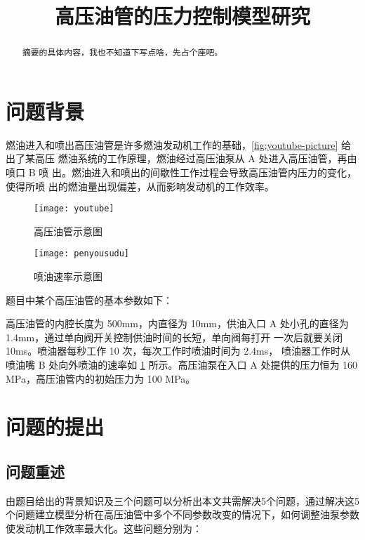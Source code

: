 \documentclass{cumcmthesis}
\title{高压油管的压力控制模型研究}
\begin{document}
\maketitle

 
 \begin{abstract}
 	摘要的具体内容，我也不知道下写点啥，先占个座吧。
 \end{abstract}

\tableofcontents

\newpage
\section{问题背景}
燃油进入和喷出高压油管是许多燃油发动机工作的基础，\cref{fig:youtube-picture} 给出了某高压
燃油系统的工作原理，燃油经过高压油泵从 A 处进入高压油管，再由喷口 B 喷
出。燃油进入和喷出的间歇性工作过程会导致高压油管内压力的变化，使得所喷
出的燃油量出现偏差，从而影响发动机的工作效率。

\begin{figure}[!h]
	\centering %
	\begin{minipage}[b]{0.4\textwidth} %
		\centering %
		\texttt{[image: youtube]} %
		\caption{高压油管示意图}
		\label{fig:youtube-picture}
	\end{minipage}
	\begin{minipage}[b]{0.4\textwidth} %
		\centering %
		\texttt{[image: penyousudu]}%
		\caption{喷油速率示意图}
		\label{fig:penyou-picture}
	\end{minipage}
\end{figure}
题目中某个高压油管的基本参数如下：

高压油管的内腔长度为 500mm，内直径为 10mm，供油入口
A 处小孔的直径为 1.4mm，通过单向阀开关控制供油时间的长短，单向阀每打开
一次后就要关闭 10ms。喷油器每秒工作 10 次，每次工作时喷油时间为 2.4ms，
喷油器工作时从喷油嘴 B 处向外喷油的速率如 \cref{fig:penyou-picture} 所示。高压油泵在入口 A 处提供的压力恒为 160 MPa，高压油管内的初始压力为 100 MPa。
\section{问题的提出}
\subsection{问题重述}
由题目给出的背景知识及三个问题可以分析出本文共需解决5个问题，通过解决这5个问题建立模型分析在高压油管中多个不同参数改变的情况下，如何调整油泵参数使发动机工作效率最大化。这些问题分别为：
\end{document}
